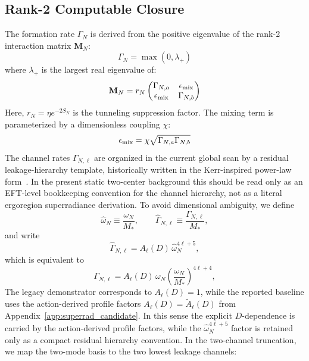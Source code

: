 \documentclass[aps,prd,onecolumn,notitlepage,nofootinbib,superscriptaddress,11pt,floatfix]{revtex4-2}
\begin{document}
\subsection{Rank-2 Computable Closure}
The formation rate $\Gamma_N$ is derived from the positive eigenvalue of the rank-2 interaction matrix $\mathbf{M}_N$:
\begin{equation}
\Gamma_{N} = \max(0, \lambda_+)
\end{equation}
where $\lambda_+$ is the largest real eigenvalue of:
\begin{equation}
\mathbf{M}_N = r_N \begin{pmatrix}
\Gamma_{N,a} & \epsilon_{\rm mix} \\
\epsilon_{\rm mix} & \Gamma_{N,b}
\end{pmatrix}
\end{equation}
Here, $r_N = \eta e^{-2S_N}$ is the tunneling suppression factor. The mixing term is parameterized by a dimensionless coupling $\chi$:
\begin{equation}
\epsilon_{\rm mix} = \chi \sqrt{\Gamma_{N,a} \Gamma_{N,b}}
\end{equation}
The channel rates $\Gamma_{N,\ell}$ are organized in the current global scan by a residual leakage-hierarchy template, historically written in the Kerr-inspired power-law form~\cite{DetweilerSuperrad1980}. In the present static two-center background this should be read only as an EFT-level bookkeeping convention for the channel hierarchy, not as a literal ergoregion superradiance derivation. To avoid dimensional ambiguity, we define
\begin{equation}
\hat{\omega}_N \equiv \frac{\omega_N}{M_*},\qquad
\hat{\Gamma}_{N,\ell}\equiv \frac{\Gamma_{N,\ell}}{M_*},
\end{equation}
and write
\begin{equation}
\hat{\Gamma}_{N,\ell} = A_\ell(D) \,\hat{\omega}_N^{4\ell+5},
\label{eq:Gamma_channel_hat}
\end{equation}
which is equivalent to
\begin{equation}
\Gamma_{N,\ell} = A_\ell(D) \, \omega_N \left(\frac{\omega_N}{M_*}\right)^{4\ell+4},
\label{eq:Gamma_channel}
\end{equation}
The legacy demonstrator corresponds to $A_\ell(D)=1$, while the reported baseline uses the action-derived profile factors $A_\ell(D)=\tilde A_\ell(D)$ from Appendix~\ref{app:superrad_candidate}. In this sense the explicit $D$-dependence is carried by the action-derived profile factors, while the $\hat{\omega}_N^{4\ell+5}$ factor is retained only as a compact residual hierarchy convention. In the two-channel truncation, we map the two-mode basis to the two lowest leakage channels:
\end{document}
